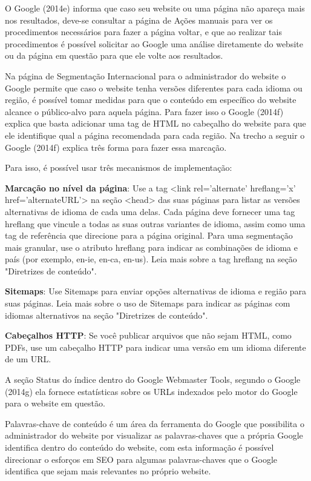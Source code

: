 \documentclass[
	12pt,				%
	openright,			%
	twoside,			%
	a4paper,			%
	english,			%
	french,				%
	spanish,			%
	brazil				%
	]{abntex2}
\begin{document}
O Google (2014e) informa que caso seu website ou uma página não apareça mais nos resultados, deve-se consultar a página de Ações manuais para ver os procedimentos necessários para fazer a página voltar, e que ao realizar tais procedimentos é possível solicitar ao Google uma análise diretamente do website ou da página em questão para que ele volte aos resultados.

Na página de Segmentação Internacional para o administrador do website o Google permite que caso o website tenha versões diferentes para cada idioma ou região, é possível tomar medidas para que o conteúdo em específico do website alcance o público-alvo para aquela página. Para fazer isso o Google (2014f) explica que basta adicionar uma tag de HTML no cabeçalho do website para que ele identifique qual a página recomendada para cada região. Na trecho a seguir o Google (2014f) explica três forma para fazer essa marcação.

\begin{citacao}
Para isso, é possível usar três mecanismos de implementação:
\item \textbf{Marcação no nível da página}: Use a tag <link rel='alternate' hreflang='x' href='alternateURL'> na seção <head> das suas páginas para listar as versões alternativas de idioma de cada uma delas. Cada página deve fornecer uma tag hreflang que vincule a todas as suas outras variantes de idioma, assim como uma tag de referência que direcione para a página original. Para uma segmentação mais granular, use o atributo hreflang para indicar as combinações de idioma e país (por exemplo, en-ie, en-ca, en-us). Leia mais sobre a tag hreflang  na seção "Diretrizes de conteúdo".  
\item \textbf{Sitemaps}: Use Sitemaps para enviar opções alternativas de idioma e região para suas páginas. Leia mais sobre o uso de Sitemaps para indicar as páginas com idiomas alternativos na seção "Diretrizes de conteúdo".
\item \textbf{Cabeçalhos HTTP}: Se você publicar arquivos que não sejam HTML, como PDFs, use um cabeçalho HTTP para indicar uma versão em um idioma diferente de um URL.
\end{citacao}

A seção Status do índice dentro do Google Webmaster Tools, segundo o Google (2014g) ela fornece estatísticas sobre os URLs indexados pelo motor do Google para o website em questão.

Palavras-chave de conteúdo é um área da ferramenta do Google que possibilita o administrador do website por visualizar as palavras-chaves que a própria Google identifica dentro do conteúdo do website, com esta informação é possível direcionar o esforços em SEO para algumas palavras-chaves que o Google identifica que sejam mais relevantes no próprio website.
\end{document}
